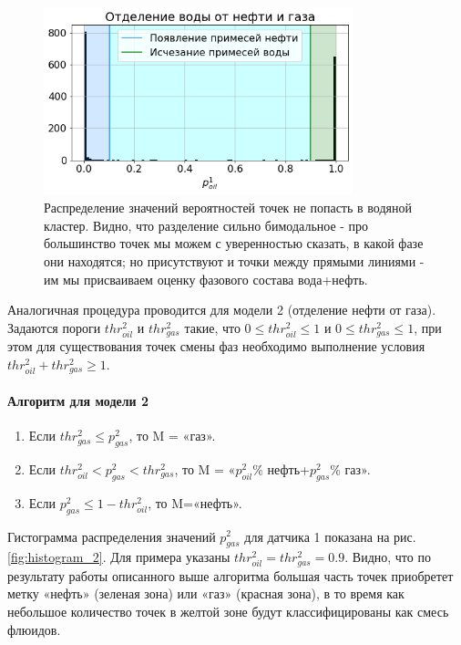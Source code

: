 \begin{figure}[H]
\centering
\includegraphics[width=0.8\textwidth]{TA/histogram_1.png}
\caption{Распределение значений вероятностей точек не попасть в водяной кластер. Видно, что разделение сильно бимодальное - про большинство точек мы можем с уверенностью сказать, в какой фазе они находятся; но присутствуют и точки между прямыми линиями - им мы присваиваем оценку фазового состава вода+нефть.}
\label{fig:histogram_1}
\end{figure}
\par
Аналогичная процедура проводится для модели 2 (отделение нефти от газа). Задаются пороги $thr_{oil}^2$ и $thr_{gas}^2$ такие, что $0\leq thr_{oil}^2\leq 1$ и $0\leq thr_{gas}^2\leq 1$, при этом для существования точек смены фаз необходимо выполнение условия $thr_{oil}^2+thr_{gas}^2\geq 1$.
\paragraph{Алгоритм для модели 2}
\begin{enumerate}[label=\arabic*.]
	\item Если $thr_{gas}^2\leq p_{gas}^2$, то M = «газ».
	\item Если $thr_{oil}^2< p_{gas}^2<thr_{gas}^2$, то M = «$p_{oil}^2$\% нефть+$p_{gas}^2$\% газ».
	\item Если $p_{gas}^2\leq 1-thr_{oil}^2$, то M=«нефть».
\end{enumerate}	
\par
Гистограмма распределения значений $p_{gas}^2$ для датчика 1 показана на рис.\ref{fig:histogram_2}. Для примера указаны $thr_{oil}^2=thr_{gas}^2=0.9$. Видно, что по результату работы описанного выше алгоритма большая часть точек приобретет метку «нефть» (зеленая зона) или «газ» (красная зона), в то время как небольшое количество точек в желтой зоне будут классифицированы как смесь флюидов.

